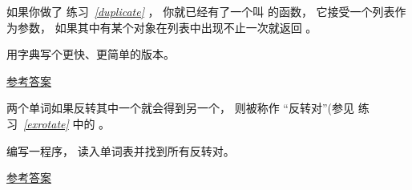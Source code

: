 \begin{exercise}



如果你做了 练习~{\em \ref{duplicate}} ， 你就已经有了一个叫 {\em {}} 的函数， 它接受一个列表作为参数， 如果其中有某个对象在列表中出现不止一次就返回 {\em {}}。

用字典写个更快、更简单的版本。

\href{http://thinkpython2.com/code/has_duplicates.py}{参考答案}


\end{exercise}


\begin{exercise}
\label{exrotatepairs}

  


两个单词如果反转其中一个就会得到另一个， 则被称作 ``反转对''(参见 练习~{\em \ref{exrotate}} 中的 {\em {}} 。

编写一程序， 读入单词表并找到所有反转对。

\href{http://thinkpython2.com/code/rotate_pairs.py}{参考答案}

\end{exercise}


